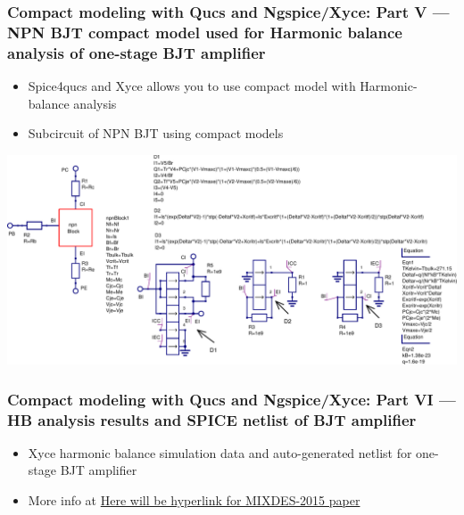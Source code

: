 \documentclass[9pt]{beamer}
\begin{document}
 
  \begin{frame}
    \frametitle{Compact modeling with Qucs and Ngspice/Xyce: Part V --- 
NPN BJT compact model used for Harmonic balance analysis of one-stage BJT 
amplifier}

\begin{itemize}
 \item Spice4qucs and Xyce allows you to use compact model with 
Harmonic-balance analysis
 \item Subcircuit of NPN BJT using compact models
\end{itemize}

\includegraphics[width=1.05\textwidth]{img/npnBlock.pdf}


 \end{frame}
 
   \begin{frame}
    \frametitle{Compact modeling with Qucs and Ngspice/Xyce: Part VI --- 
HB analysis results and SPICE netlist of BJT amplifier}

\vspace{-2cm}
\begin{itemize}
 \item Xyce harmonic balance simulation data and auto-generated netlist for 
one-stage BJT amplifier
 \item More info at \url{Here will be hyperlink for MIXDES-2015 paper}
\end{itemize}
\vspace{3mm}

{}


 \end{frame}
 
\end{document}
